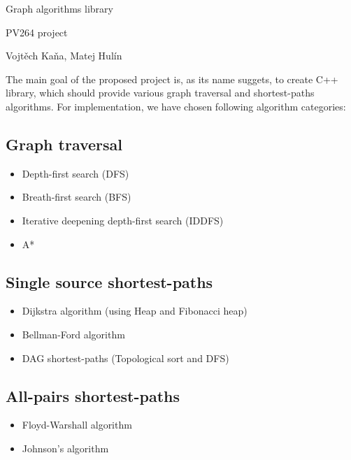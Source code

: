\documentclass{article}
\begin{document}
\huge
\begin{center}
Graph algorithms library

\vspace{10pt}
\large
PV264 project
\vspace{10pt}

\normalsize
\foreignlanguage{czech}{Vojtěch Kaňa, Matej Hulín}
\vspace{20pt}
\end{center}

\normalsize

The main goal of the proposed project is, as its name suggets, to create C++ library, which should provide various graph traversal and shortest-paths algorithms. For implementation, we have chosen following algorithm categories:

\subsection*{Graph traversal}
\begin{itemize}
\item Depth-first search (DFS)
\item Breath-first search (BFS)
\item Iterative deepening depth-first search (IDDFS) 
\item A*
\end{itemize}
\subsection*{Single source shortest-paths}
\begin{itemize}
\item Dijkstra algorithm (using Heap and Fibonacci heap)
\item Bellman-Ford algorithm
\item DAG shortest-paths (Topological sort and DFS)
\end{itemize}
\subsection*{All-pairs shortest-paths}
\begin{itemize}
\item Floyd-Warshall algorithm
\item Johnson's algorithm
\end{itemize}
\end{document}
